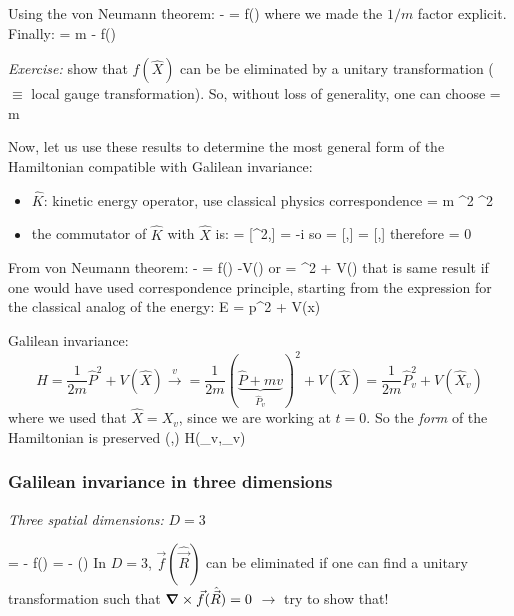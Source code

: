 \documentclass[12pt]{article}
\begin{document}
Using the von Neumann theorem:
\be
{} -  =  f()
\ee
where we made the $1/m$ factor explicit. Finally:
\setcounter{equation}{77}
\be
{} = m - f()
\ee

 \emph{Exercise:} show that $f(\hat{X})$ can be
be eliminated by a unitary transformation 
($\equiv$ local gauge transformation).
So, without loss of generality, one can choose
\be
{} = m 
\label{eq:g79}
\ee

Now, let us use these results to determine the
most general form of the Hamiltonian compatible
with Galilean invariance:
\begin{itemize}
\item $\hat{K}$: kinetic energy operator, use classical physics
correspondence
\be
{} =  m ^2
  ^2
\ee
\item the commutator of $\hat{K}$ with $\hat{X}$ is:
 = 
[^2,] = -i\hbar{}
\ee
so
\be
{} =  [,]
 = [,]
\ee
therefore
 = 0
\ee
\end{itemize}
From von Neumann theorem:
\be
{}- = f() \equiv -V()
\ee
or
\be
{} =  ^2 + V()
\ee
that is same result if one would have used correspondence
principle, starting from the expression for the
classical analog of the energy:
\be
E =  p^2 + V(x)
\ee

Galilean invariance:
\[
\hat{H} = \frac{1}{2m} \hat{P}^2 + V(\hat{X}) \xrightarrow{v}
= \frac{1}{2m} (
\underbrace{\hat{P}+mv}_{\hat{P}_v})^2 + V(\hat{X})
= \frac{1}{2m} \hat{P}_v^2 + V(\hat{X}_v)
\]
where we used that $\hat{X} = X_v$, since we are working at $t=0$.
So the \emph{form} of the Hamiltonian is preserved
\be
{}(,) \to H(_v,_v)
\ee

\subsubsection{Galilean invariance in three dimensions}

\emph{Three spatial dimensions:} $D = 3$

\be
{} =  -  f() \to
{} =  -  () 
\ee
In $D = 3$, $\vec{f}(\hat{\vec{R}})$ can be eliminated if one can
find a unitary transformation such that
$\grad \times \vec{f}(\hat{\vec{R}})= 0$ $\to$ try to show that!
\end{document}
